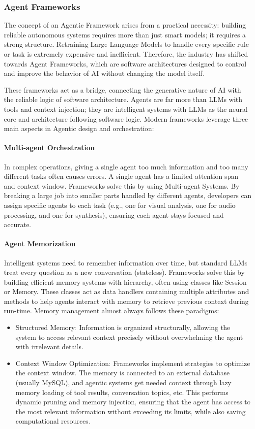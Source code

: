 \subsubsection*{Agent Frameworks}
The concept of an Agentic Framework arises from a practical necessity: building reliable autonomous systems requires more than just smart models; it requires a strong structure. Retraining Large Language Models to handle every specific rule or task is extremely expensive and inefficient. Therefore, the industry has shifted towards Agent Frameworks, which are software architectures designed to control and improve the behavior of AI without changing the model itself.

These frameworks act as a bridge, connecting the generative nature of AI with the reliable logic of software architecture. Agents are far more than LLMs with tools and context injection; they are intelligent systems with LLMs as the neural core and architecture following software logic. Modern frameworks leverage three main aspects in Agentic design and orchestration:

\paragraph*{{Multi-agent Orchestration}} 
In complex operations, giving a single agent too much information and too many different tasks often causes errors. A single agent has a limited attention span and context window. Frameworks solve this by using Multi-agent Systems. By breaking a large job into smaller parts handled by different agents, developers can assign specific agents to each task (e.g., one for visual analysis, one for audio processing, and one for synthesis), ensuring each agent stays focused and accurate.

\paragraph*{{Agent Memorization}}
Intelligent systems need to remember information over time, but standard LLMs treat every question as a new conversation (stateless). Frameworks solve this by building efficient memory systems with hierarchy, often using classes like Session or Memory. These classes act as data handlers containing multiple attributes and methods to help agents interact with memory to retrieve previous context during run-time. Memory management almost always follows these paradigms:
\begin{itemize}
    \item {Structured Memory:} Information is organized structurally, allowing the system to access relevant context precisely without overwhelming the agent with irrelevant details.
    \item {Context Window Optimization:} Frameworks implement strategies to optimize the context window. The memory is connected to an external database (usually MySQL), and agentic systems get needed context through lazy memory loading of tool results, conversation topics, etc. This performs dynamic pruning and memory injection, ensuring that the agent has access to the most relevant information without exceeding its limits, while also saving computational resources.
\end{itemize}

